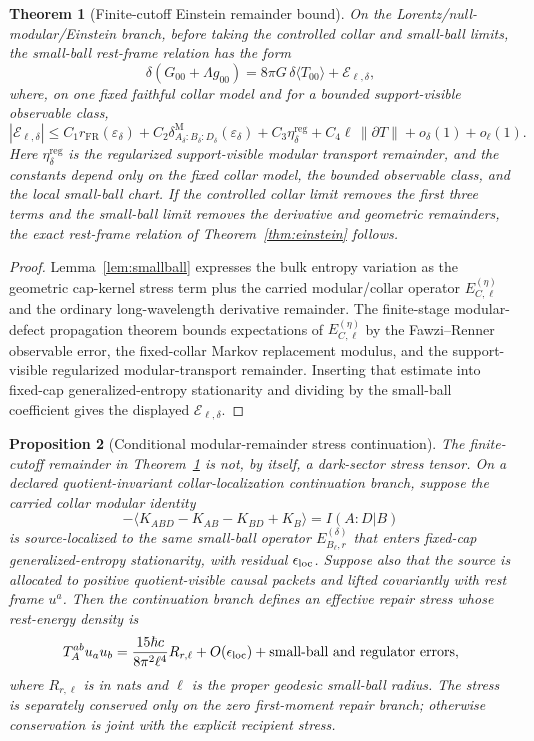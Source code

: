 \documentclass[11pt]{article}
\newtheorem{theorem}{Theorem}[section]
\newtheorem{proposition}[theorem]{Proposition}
\begin{document}
\begin{theorem}[Finite-cutoff Einstein remainder bound]\label{thm:einstein-remainder}
On the Lorentz/null-modular/Einstein branch, before taking the controlled
collar and small-ball limits, the small-ball rest-frame relation has the form
\[
\delta\!\left(G_{00}+\Lambda g_{00}\right)
=
8\pi G\,\delta\langle T_{00}\rangle
+\mathcal E_{\ell,\delta},
\]
where, on one fixed faithful collar model and for a bounded support-visible
observable class,
\[
|\mathcal E_{\ell,\delta}|
\le
C_1 r_{\mathrm{FR}}(\varepsilon_\delta)
+C_2\delta^{\mathrm M}_{A_\delta:B_\delta:D_\delta}(\varepsilon_\delta)
+C_3\eta^{\mathrm{reg}}_\delta
+C_4\ell\,\|\partial T\|
+o_\delta(1)+o_\ell(1).
\]
Here \(\eta^{\mathrm{reg}}_\delta\) is the regularized support-visible modular
transport remainder, and the constants depend only on the fixed collar model,
the bounded observable class, and the local small-ball chart. If the controlled
collar limit removes the first three terms and the small-ball limit removes
the derivative and geometric remainders, the exact rest-frame relation of
Theorem~\ref{thm:einstein} follows.
\end{theorem}

\begin{proof}
Lemma~\ref{lem:smallball} expresses the bulk entropy variation as the geometric
cap-kernel stress term plus the carried modular/collar operator
\(E^{(\eta)}_{C,\ell}\) and the ordinary long-wavelength derivative
remainder. The finite-stage modular-defect propagation theorem bounds
expectations of \(E^{(\eta)}_{C,\ell}\) by the Fawzi--Renner observable error,
the fixed-collar Markov replacement modulus, and the support-visible
regularized modular-transport remainder. Inserting that estimate into
fixed-cap generalized-entropy stationarity and dividing by the
small-ball coefficient gives the displayed \(\mathcal E_{\ell,\delta}\).
\end{proof}

\begin{proposition}[Conditional modular-remainder stress continuation]\label{prop:conditional-modular-remainder-stress}
The finite-cutoff remainder in Theorem~\ref{thm:einstein-remainder} is not, by
itself, a dark-sector stress tensor.  On a declared quotient-invariant
collar-localization continuation branch, suppose the carried collar modular
identity
\[
  -\langle K_{ABD}-K_{AB}-K_{BD}+K_B\rangle=I(A:D|B)
\]
is source-localized to the same small-ball operator
\(E_{B_\ell,r}^{(\delta)}\) that enters fixed-cap generalized-entropy
stationarity, with residual \(\epsilon_{\rm loc}\).  Suppose also that the
source is allocated to positive quotient-visible causal packets and lifted
covariantly with rest frame \(u^a\).  Then the continuation branch defines an
effective repair stress whose rest-energy density is
\[
  T_A^{ab}u_a u_b
  =
  \frac{15\hbar c}{8\pi^2\ell^4}R_{r,\ell}
  +O(\epsilon_{\rm loc})+\hbox{small-ball and regulator errors},
\]
where \(R_{r,\ell}\) is in nats and \(\ell\) is the proper geodesic small-ball
radius.  The stress is separately conserved only on the zero first-moment
repair branch; otherwise conservation is joint with the explicit recipient
stress.
\end{proposition}
\end{document}
